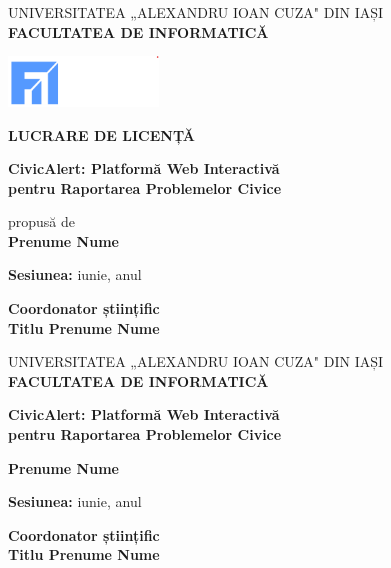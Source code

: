 \documentclass[12pt,a4paper]{report}
\begin{document}
\begin{titlepage}
\begin{center}
\large
UNIVERSITATEA „ALEXANDRU IOAN CUZA" DIN IAȘI\\
\vspace{0.5cm}
\textbf{FACULTATEA DE INFORMATICĂ}\\
\vspace{2cm}

\includegraphics[width=4cm]{logo_uaic.png}\\
\vspace{2cm}

\Large
\textbf{LUCRARE DE LICENȚĂ}\\
\vspace{1.5cm}

\huge
\textbf{CivicAlert: Platformă Web Interactivă\\pentru Raportarea Problemelor Civice}\\
\vspace{1cm}

\large
propusă de\\
\vspace{0.5cm}
\textbf{Prenume Nume}\\
\vspace{2cm}

\textbf{Sesiunea:} iunie, anul\\
\vspace{1cm}

\textbf{Coordonator științific}\\
\textbf{Titlu Prenume Nume}\\

\end{center}
\end{titlepage}

\newpage
\begin{center}
\large
UNIVERSITATEA „ALEXANDRU IOAN CUZA" DIN IAȘI\\
\vspace{0.5cm}
\textbf{FACULTATEA DE INFORMATICĂ}\\
\vspace{4cm}

\huge
\textbf{CivicAlert: Platformă Web Interactivă\\pentru Raportarea Problemelor Civice}\\
\vspace{2cm}

\large
\textbf{Prenume Nume}\\
\vspace{2cm}

\textbf{Sesiunea:} iunie, anul\\
\vspace{4cm}

\textbf{Coordonator științific}\\
\textbf{Titlu Prenume Nume}\\

\end{center}
\end{document}
